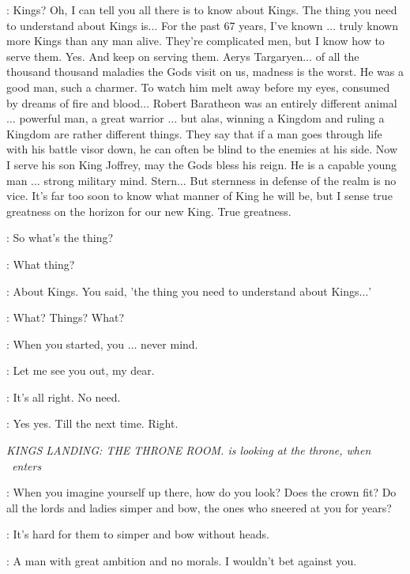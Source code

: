 \PYCELLE: Kings? Oh, I can tell you all there is to know about Kings. The thing you need to understand about Kings is$\ldots$ For the past 67 years, I've known $\ldots$ truly known more Kings than any man alive. They're complicated men, but I know how to serve them. Yes. And keep on serving them. Aerys Targaryen$\ldots$ of all the thousand thousand maladies the Gods visit on us, madness is the worst. He was a good man, such a charmer. To watch him melt away before my eyes, consumed by dreams of fire and blood$\ldots$ Robert Baratheon was an entirely different animal $\ldots$ powerful man, a great warrior $\ldots$ but alas, winning a Kingdom and ruling a Kingdom are rather different things. They say that if a man goes through life with his battle visor down, he can often be blind to the enemies at his side. Now I serve his son King Joffrey, may the Gods bless his reign. He is a capable young man $\ldots$ strong military mind. Stern$\ldots$ But sternness in defense of the realm is no vice. It's far too soon to know what manner of King he will be, but I sense true greatness on the horizon for our new King. True greatness. 

\ROS: So what's the thing? 

\PYCELLE: What thing? 

\ROS: About Kings. You said, 'the thing you need to understand about Kings$\ldots$' 

\PYCELLE: What? Things? What? 

\ROS: When you started, you $\ldots$ never mind. 

\PYCELLE: Let me see you out, my dear. 

\ROS: It's all right. No need. 


\PYCELLE: Yes yes. Till the next time. Right. 



\scene

\textit{KINGS LANDING: THE THRONE ROOM.  \LITTLEFINGER is looking at the throne, when \VARYS ~enters} 

\VARYS: When you imagine yourself up there, how do you look? Does the crown fit? Do all the lords and ladies simper and bow, the ones who sneered at you for years? 

\LITTLEFINGER: It's hard for them to simper and bow without heads. 

\VARYS: A man with great ambition and no morals. I wouldn't bet against you. 

